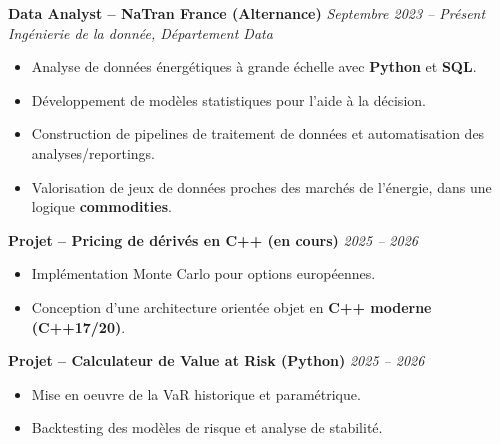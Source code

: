 \textbf{Data Analyst -- NaTran France (Alternance)} \hfill \textit{Septembre 2023 -- Présent}\\
\textit{Ingénierie de la donnée, Département Data}
\begin{itemize}
    \item Analyse de données énergétiques à grande échelle avec \textbf{Python} et \textbf{SQL}.
    \item Développement de modèles statistiques pour l'aide à la décision.
    \item Construction de pipelines de traitement de données et automatisation des analyses/reportings.
    \item Valorisation de jeux de données proches des marchés de l'énergie, dans une logique \textbf{commodities}.
\end{itemize}

\textbf{Projet -- Pricing de dérivés en C++ (en cours)} \hfill \textit{2025 -- 2026}\\
\begin{itemize}
    \item Implémentation Monte Carlo pour options européennes.
    \item Conception d'une architecture orientée objet en \textbf{C++ moderne (C++17/20)}.
\end{itemize}

\textbf{Projet -- Calculateur de Value at Risk (Python)} \hfill \textit{2025 -- 2026}\\
\begin{itemize}
    \item Mise en oeuvre de la VaR historique et paramétrique.
    \item Backtesting des modèles de risque et analyse de stabilité.
\end{itemize}
